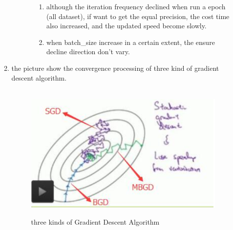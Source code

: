 \documentclass[12pt]{ctexart}%
\begin{document}
\begin{itemize}
\begin{enumerate}[(1)]
\begin{enumerate}
\begin{enumerate}[i]
\begin{enumerate}[1)]
										\item although the iteration frequency declined when run a epoch (all dataset), if want to get the equal precision, the cost time also increased, and the updated speed become slowly.
										
										\item when batch\_size increase in a certain extent, the ensure decline direction don't vary.
									\end{enumerate}
							\end{enumerate}
					\end{enumerate}
				
				\item the picture show the convergence processing of three kind of gradient descent algorithm.
					\begin{figure}[H]
						\vspace{-0.2cm}  %
						\setlength{\abovecaptionskip}{-0.2cm}   %
						\centering
						\includegraphics[scale=0.4]{Mini-Batch_Gradient_Descent.png}
						\renewcommand{\figurename}{Fig} %
						\caption{three kinds of Gradient Descent Algorithm}
						\label{fig:5}
					\end{figure}
			\end{enumerate}
		\end{itemize}
	
\end{document}
